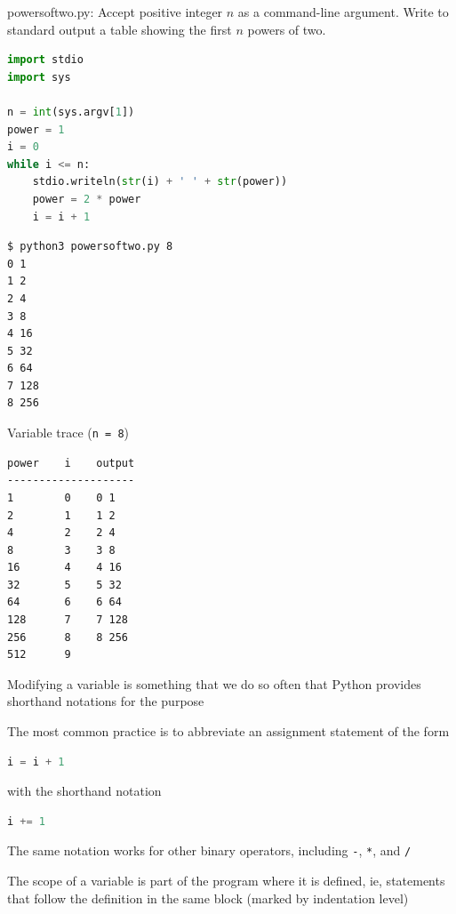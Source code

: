 \documentclass[8pt,a4paper,compress]{beamer}
\begin{document}
\begin{frame}[fragile]
\pause

\begin{framed}
\tiny powersoftwo.py: Accept positive integer $n$ as a command-line argument. Write to standard output a table showing the first $n$ powers of two.
\end{framed}

\begin{lstlisting}[language=Python,style=focusin]
import stdio
import sys

n = int(sys.argv[1])
power = 1
i = 0
while i <= n:
    stdio.writeln(str(i) + ' ' + str(power))    
    power = 2 * power
    i = i + 1
\end{lstlisting}

\pause\bigskip

\begin{minipage}{150pt}
\begin{lstlisting}[language={},style=focusin]
$ python3 powersoftwo.py 8
0 1
1 2
2 4
3 8
4 16
5 32
6 64
7 128
8 256
\end{lstlisting}
\end{minipage}\hfill
\begin{minipage}{100pt}
Variable trace (\lstinline{n = 8})
\begin{lstlisting}[language={},style=focusin]
power    i    output
--------------------
1        0    0 1
2        1    1 2
4        2    2 4
8        3    3 8
16       4    4 16
32       5    5 32
64       6    6 64
128      7    7 128
256      8    8 256
512      9
\end{lstlisting}
\end{minipage}
\end{frame}

\begin{frame}[fragile]
\pause

Modifying a variable is something that we do so often that Python provides shorthand notations for the purpose

\pause
\bigskip

The most common practice is to abbreviate an assignment statement of the form 

\smallskip

\begin{lstlisting}[language=Python,style=focusin]
i = i + 1
\end{lstlisting}

\smallskip

with the shorthand notation

\smallskip

\begin{lstlisting}[language=Python,style=focusin]
i += 1
\end{lstlisting}

\pause\bigskip

The same notation works for other binary operators, including \lstinline{-}, \lstinline{*}, and \lstinline{/}

\pause\bigskip

The scope of a variable is part of the program where it is defined, ie, statements that follow the definition in the same block (marked by indentation level)
\end{frame}
\end{document}
